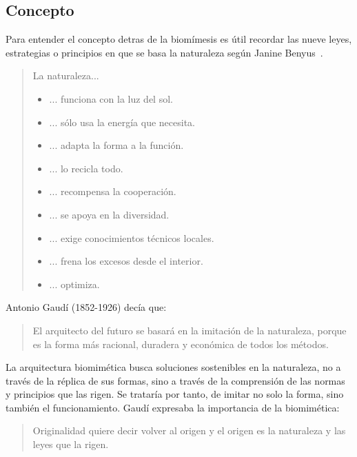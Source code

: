 \documentclass[twocolumn,amsmath,amssymb,aps,floatfix]{revtex4-2}
\begin{document}
\subsection{Concepto}

Para entender el concepto detras de la biomímesis es útil recordar las nueve leyes, estrategias o principios en que se basa la naturaleza
según Janine Benyus~\cite{Benyus2012}.

\begin{itshape}
\begin{quote}
   La naturaleza...
\begin{itemize}
    \item [1.] ... funciona con la luz del sol.
    \item [2.] ... sólo usa la energía que necesita.
    \item [3.] ... adapta la forma a la función.
    \item [4.] ... lo recicla todo.
    \item [5.] ... recompensa la cooperación.
    \item [6.] ... se apoya en la diversidad.
    \item [7.] ... exige conocimientos técnicos locales.
    \item [8.] ... frena los excesos desde el interior.
    \item [9.] ... optimiza.
\end{itemize}   
\end{quote}
\end{itshape}

\noindent Antonio Gaudí (1852-1926) decía que:
\begin{itshape}
   \begin{quote}
      El arquitecto del futuro se basará en la imitación de la naturaleza,
      porque es la forma más racional, duradera y económica de todos los métodos.
   \end{quote}
\end{itshape}

\noindent La arquitectura biomimética busca soluciones sostenibles en la naturaleza, no a través de la réplica de sus formas, sino a través de la comprensión
de las normas y principios que las rigen. Se trataría por tanto, de imitar no solo la forma, sino también el funcionamiento.
Gaudí expresaba la importancia de la biomimética:
\begin{itshape}
   \begin{quote}
      Originalidad quiere decir volver al origen y el origen
      es la naturaleza y las leyes que la rigen.
   \end{quote}
\end{itshape}
\end{document}

